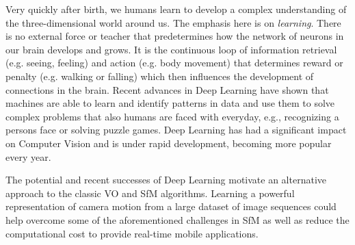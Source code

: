 		Very quickly after birth, we humans learn to develop a complex understanding of the three-dimensional world around us. 
		The emphasis here is on \emph{learning}.
		There is no external force or teacher that predetermines how the network of neurons in our brain develops and grows.
		It is the continuous loop of information retrieval (e.g. seeing, feeling) and action (e.g. body movement) that determines reward or penalty (e.g. walking or falling) which then influences the development of connections in the brain.
		Recent advances in Deep Learning have shown that machines are able to learn and identify patterns in data and use them to solve complex problems that also humans are faced with everyday, e.g., recognizing a persons face or solving puzzle games.
		Deep Learning has had a significant impact on Computer Vision and is under rapid development, becoming more popular every year.
		
		The potential and recent successes of Deep Learning motivate an alternative approach to the classic VO and SfM algorithms.
		Learning a powerful representation of camera motion from a large dataset of image sequences could help overcome some of the aforementioned challenges in SfM as well as reduce the computational cost to provide real-time mobile applications.
		
		
		
		
		
		
